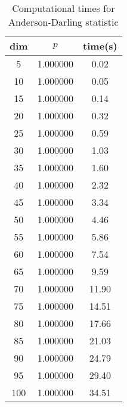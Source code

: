 \begin{table}[htbp]
\begin{center}
\begin{tabular}{ccc}
dim& $p$ & time(s)\\
\hline
5 & 1.000000 & 0.02 \\ 
10 & 1.000000 & 0.05 \\ 
15 & 1.000000 & 0.14 \\ 
20 & 1.000000 & 0.32 \\ 
25 & 1.000000 & 0.59 \\ 
30 & 1.000000 & 1.03 \\ 
35 & 1.000000 & 1.60 \\ 
40 & 1.000000 & 2.32 \\ 
45 & 1.000000 & 3.34 \\ 
50 & 1.000000 & 4.46 \\ 
55 & 1.000000 & 5.86 \\ 
60 & 1.000000 & 7.54 \\ 
65 & 1.000000 & 9.59 \\ 
70 & 1.000000 & 11.90 \\ 
75 & 1.000000 & 14.51 \\ 
80 & 1.000000 & 17.66 \\ 
85 & 1.000000 & 21.03 \\ 
90 & 1.000000 & 24.79 \\ 
95 & 1.000000 & 29.40 \\ 
100 & 1.000000 & 34.51 \\ 
\hline
\end{tabular}
\end{center}
\caption{Computational times for Anderson-Darling statistic}
\label{tab:AD}
\end{table}
